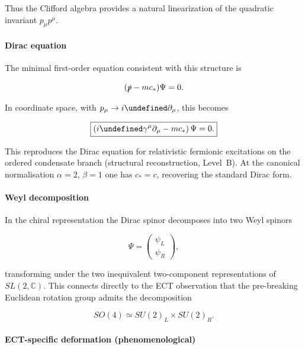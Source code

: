 \documentclass[11pt,a4paper]{article}
\let\hbar\undefined
\numberwithin{equation}{section}
\begin{document}
Thus the Clifford algebra provides a natural linearization of the
quadratic invariant $p_\mu p^\mu$.

\paragraph{Dirac equation}

The minimal first-order equation consistent with this structure is

\begin{equation}
(\slashed{p}-mc_*)\Psi=0 .
\end{equation}

In coordinate space, with $p_\mu\rightarrow i\hbar\partial_\mu$, this
becomes

\begin{equation}
\boxed{
\left(i\hbar\gamma^\mu\partial_\mu - mc_*\right)\Psi = 0 .
}
\end{equation}

This reproduces the Dirac equation for relativistic fermionic excitations
on the ordered condensate branch (structural reconstruction, Level~B).
At the canonical normalisation $\alpha=2$, $\beta=1$ one has
$c_*=c$, recovering the standard Dirac form.

\paragraph{Weyl decomposition}

In the chiral representation the Dirac spinor decomposes into two Weyl
spinors

\begin{equation}
\Psi=
\begin{pmatrix}
\psi_L\\
\psi_R
\end{pmatrix},
\end{equation}

transforming under the two inequivalent two-component representations of
$SL(2,\mathbb C)$. This connects directly to the ECT observation that
the pre-breaking Euclidean rotation group admits the decomposition

\begin{equation}
SO(4)\simeq SU(2)_L\times SU(2)_R .
\end{equation}

\paragraph{ECT-specific deformation (phenomenological)}
\end{document}
